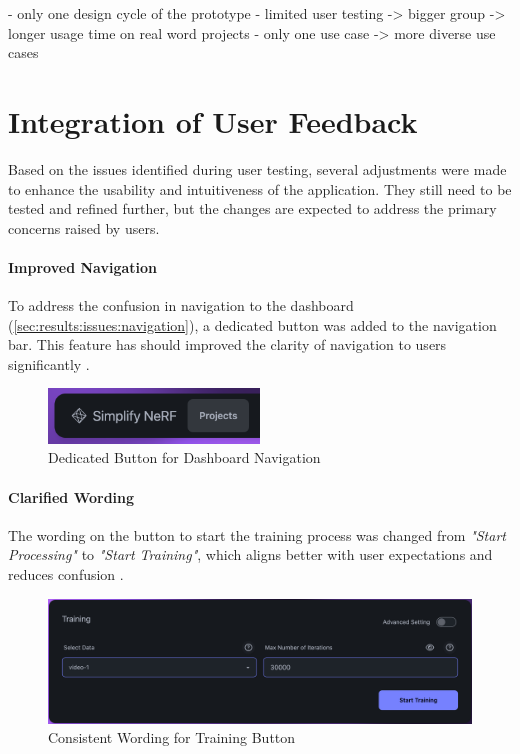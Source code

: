 - only one design cycle of the prototype
- limited user testing -> bigger group -> longer usage time on real word projects
- only one use case -> more diverse use cases

\section{Integration of User Feedback}
\label{sec:discussion:user-feedback}

Based on the issues identified during user testing, several adjustments were made to enhance the usability and intuitiveness of the application.
They still need to be tested and refined further, but the changes are expected to address the primary concerns raised by users.

\paragraph{Improved Navigation}
To address the confusion in navigation to the dashboard (\ref{sec:results:issues:navigation}), a dedicated button was added to the navigation bar.
This feature has should improved the clarity of  navigation to users significantly .

\begin{figure}[htb]
  \centering
	\includegraphics[width=0.5\textwidth]{figures/fix-1.png}
	\caption{Dedicated Button for Dashboard Navigation}
  \label{fig:fix-1}
\end{figure}

\paragraph{Clarified Wording}
The wording on the button to start the training process was changed from \emph{"Start Processing"} to \emph{"Start Training"}, which aligns better with user expectations and reduces confusion .

\begin{figure}[htb]
	\includegraphics[width=\textwidth]{figures/fix-2.png}
	\caption{Consistent Wording for Training Button}
  \label{fig:fix-2}
\end{figure}

